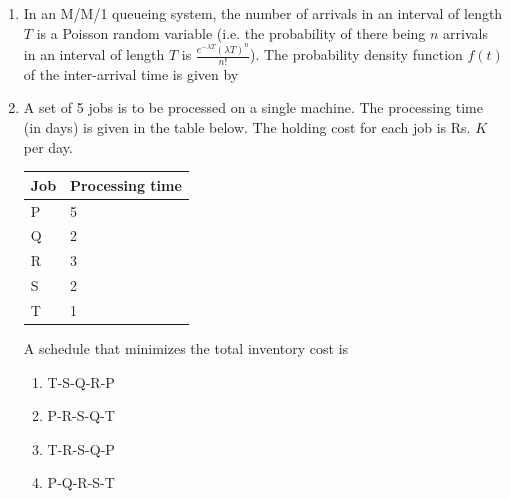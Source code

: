 \documentclass[journal,12pt,onecolumn]{IEEEtran}
\begin{document}
\begin{enumerate}
    \item In an M/M/1 queueing system, the number of arrivals in an interval of length $T$ is a Poisson random variable (i.e. the probability of there being $n$ arrivals in an interval of length $T$ is $\frac{e^{-\lambda T}(\lambda T)^n}{n!}$). The probability density function $f(t)$ of the inter-arrival time is given by
          \begin{enumerate}
          \end{enumerate}

    \item A set of 5 jobs is to be processed on a single machine. The processing time (in days) is given in the table below. The holding cost for each job is Rs. $K$ per day.
          \begin{table}[H]
              \centering\large
              \begin{tabular}{|l|l|}
                  \hline
                  \textbf{Job} & \textbf{Processing time} \\
                  \hline
                  P            & 5                        \\\hline
                  Q            & 2                        \\\hline
                  R            & 3                        \\\hline
                  S            & 2                        \\\hline
                  T            & 1                        \\\hline
              \end{tabular}
              \label{q18}
          \end{table}
          A schedule that minimizes the total inventory cost is

          \begin{enumerate}
              \item T-S-Q-R-P
              \item P-R-S-Q-T
              \item T-R-S-Q-P
              \item P-Q-R-S-T
          \end{enumerate}


\end{enumerate}
\end{document}
